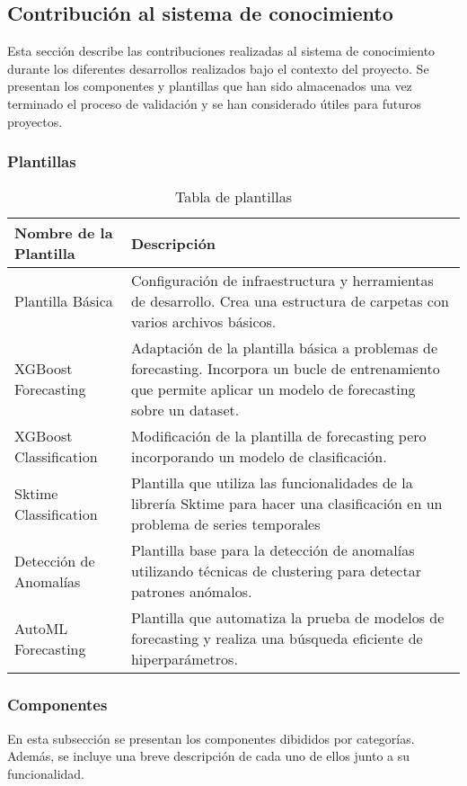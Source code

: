 \subsection{Contribución al sistema de conocimiento}
Esta sección describe las contribuciones realizadas al sistema de conocimiento
durante los diferentes desarrollos realizados bajo el contexto del proyecto. 
Se presentan los componentes y plantillas que han sido almacenados una vez
terminado el proceso de validación y se han considerado útiles para futuros
proyectos.

\subsubsection{Plantillas}
\begin{table}[h!]
    \centering
    \begin{tabular}{| m{4cm} | m{8cm} |}
      \hline
      \textbf{Nombre de la Plantilla} & \textbf{Descripción} \\ 
      \hline
      Plantilla Básica & Configuración de infraestructura y herramientas de desarrollo.
      Crea una estructura de carpetas con varios archivos básicos. \\ 
      \hline
      XGBoost Forecasting & Adaptación de la plantilla básica a problemas de forecasting.
      Incorpora un bucle de entrenamiento que permite aplicar un modelo de forecasting sobre un dataset.\\ 
      \hline
      XGBoost Classification & Modificación de la plantilla de forecasting pero incorporando un modelo
      de clasificación.\\ 
      \hline
      Sktime Classification & Plantilla que utiliza las funcionalidades de la librería 
      Sktime para hacer una clasificación en un problema de series temporales \\ 
      \hline
      Detección de Anomalías & Plantilla base para la detección de anomalías 
      utilizando técnicas de clustering para detectar patrones anómalos.\\ 
      \hline
      AutoML Forecasting &  Plantilla que automatiza la prueba de modelos 
      de forecasting y realiza una búsqueda eficiente de hiperparámetros.\\ 
      \hline
    \end{tabular}
    \caption{Tabla de plantillas}
    \label{table:templates}
\end{table}

\subsubsection{Componentes}
En esta subsección se presentan los componentes dibididos por categorías.
Además, se incluye una breve descripción de cada uno de ellos junto a su funcionalidad.

